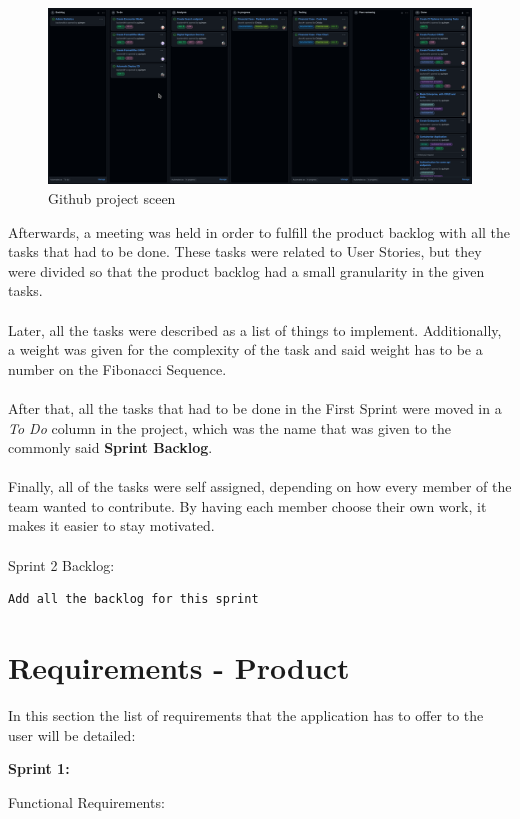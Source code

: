 \documentclass[./main.tex]{subfiles}
\begin{document}
\begin{figure}[h]
\centering
\includegraphics[width=\linewidth]{img/scrum_board.png}
\caption{Github project sceen}
\end{figure}
Afterwards, a meeting was held in order to fulfill the product backlog
with all the tasks that had to be done. These tasks were related to User
Stories, but they were divided so that the product backlog had a small
granularity in the given tasks.
\\
\\
Later, all the tasks were described as a list of things to implement.
Additionally, a weight was given for the complexity of the task and
said weight has to be a number on the Fibonacci Sequence.
\\
\\
After that, all the tasks that had to be done in the First Sprint were
moved in a \emph{To Do} column in the project, which was the name that
was given to the commonly said \textbf{Sprint Backlog}.
\\
\\
Finally, all of the tasks were self assigned, depending on how every
member of the team wanted to contribute. By having each member choose
their own work, it makes it easier to stay motivated.
\\
\\
Sprint 2 Backlog:
\begin{verbatim}
Add all the backlog for this sprint
\end{verbatim}

\section{Requirements - Product}

In this section the list of requirements that the application has to
offer to the user will be detailed:

\textbf{Sprint 1:}

Functional Requirements:
\end{document}
